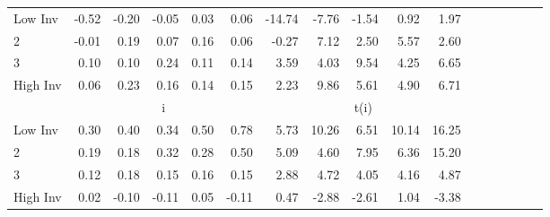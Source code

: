 \begin{table}[!ht]
\begin{tabular}{lrrrrrrrrrrrrrrrr}
    \\
      \cmidrule(r){2-5} \cmidrule(r){6-9} \cmidrule(r){10-13} \cmidrule(r){14-17}

    Low Inv   & -0.52  & -0.20  & -0.05  & 0.03  & 0.06  & -14.74  & -7.76  & -1.54  & 0.92  & 1.97  \\
           2  & -0.01  & 0.19  & 0.07  & 0.16  & 0.06  & -0.27  & 7.12  & 2.50  & 5.57  & 2.60  \\
           3  & 0.10  & 0.10  & 0.24  & 0.11  & 0.14  & 3.59  & 4.03  & 9.54  & 4.25  & 6.65  \\
    High Inv  & 0.06  & 0.23  & 0.16  & 0.14  & 0.15  & 2.23  & 9.86  & 5.61  & 4.90  & 6.71  \\

  
    
      & \multicolumn{5}{c}{i} & \multicolumn{5}{c}{t(i)}
    
    \\
      \cmidrule(r){2-5} \cmidrule(r){6-9} \cmidrule(r){10-13} \cmidrule(r){14-17}

    Low Inv   & 0.30  & 0.40  & 0.34  & 0.50  & 0.78  & 5.73  & 10.26  & 6.51  & 10.14  & 16.25  \\
           2  & 0.19  & 0.18  & 0.32  & 0.28  & 0.50  & 5.09  & 4.60  & 7.95  & 6.36  & 15.20  \\
           3  & 0.12  & 0.18  & 0.15  & 0.16  & 0.15  & 2.88  & 4.72  & 4.05  & 4.16  & 4.87  \\
    High Inv  & 0.02  & -0.10  & -0.11  & 0.05  & -0.11  & 0.47  & -2.88  & -2.61  & 1.04  & -3.38  \\

  

  \bottomrule
\end{tabular}
\label{tbl:25_Size_BM_Inv_FF2015}
\end{table}